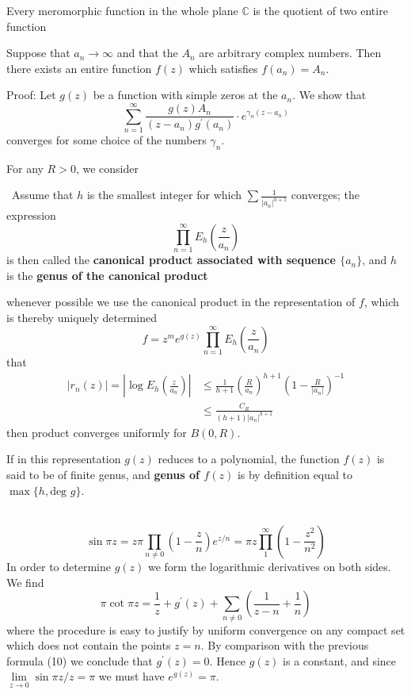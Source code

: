 \documentclass[12pt, oneside]{book}
\begin{document}
\begin{corollary}
    Every meromorphic function in the whole plane $\mathbb{C}$ is the quotient of two entire function
\end{corollary}
\begin{corollary}[Interpolation]
    Suppose that $a_n \rightarrow \infty$ and that the $A_n$ are arbitrary complex numbers. Then there exists an entire function $f(z)$ which satisfies $f\left(a_n\right)=A_n$.

    Proof:
    Let $g(z)$ be a function with simple zeros at the $a_n$. We show that
    $$\sum_{n=1}^{\infty}  \frac{g(z)A_n}{(z-a_n)g^{\prime}(a_n)} \cdot e^{\gamma_n\left(z-a_n\right)}$$
    converges for some choice of the numbers $\gamma_n$.

    For any $R>0$, we consider
\end{corollary}
\begin{definition}\
    Assume that $h$ is the smallest integer for which $\sum\frac{1}{\left|a_n\right|^{h+1}}$ converges; the expression
    $$\prod_{n=1}^{\infty}E_h\left(\frac{z}{a_n}\right)$$
    is then called the \textbf{canonical product associated with sequence $\{a_n\}$}, and $h$ is the \textbf{genus of the canonical product}

    whenever possible we use the canonical product in the representation of $f$, which is thereby uniquely determined
    $$f=z^me^{g(z)}\prod_{n=1}^{\infty}E_h\left(\frac{z}{a_n}\right)$$
    that
    $$\begin{aligned}
            \left|r_n(z)\right|=\left|\log E_h\left(\frac{z}{a_n}\right)\right| & \leq\frac{1}{h+1}\left(\frac{R}{a_n}\right)^{h+1}\left(1-\frac{R}{\left|a_n\right|}\right)^{-1} \\
                                                                                & \leq \frac{C_R}{(h+1)\left|a_n\right|^{h+1}}
        \end{aligned}
    $$
    then product converges uniformly for $B(0,R)$.

    If in this representation $g(z)$ reduces to a polynomial, the function $f(z)$ is said to be of finite genus, and \textbf{genus of $f(z)$} is by definition equal to $\max\{h,\text{deg } g\}$.
\end{definition}
\begin{theorem}\
    $$
        \sin \pi z=z \pi \prod_{n \neq 0}\left(1-\frac{z}{n}\right) e^{z / n}
        =\pi z \prod_1^{\infty}\left(1-\frac{z^2}{n^2}\right)
    $$
    In order to determine $g(z)$ we form the logarithmic derivatives on both sides. We find
    $$\pi \cot \pi z=\frac{1}{z}+g^{\prime}(z)+\sum_{n \neq 0}\left(\frac{1}{z-n}+\frac{1}{n}\right)$$
    where the procedure is easy to justify by uniform convergence on any compact set which does not contain the points $z=n$. By comparison with the previous formula (10) we conclude that $g^{\prime}(z)=0$. Hence $g(z)$ is a constant, and since $\lim\limits_{z \rightarrow 0} \sin \pi z / z=\pi$ we must have $e^{g(z)}=\pi$.
\end{theorem}
\end{document}

